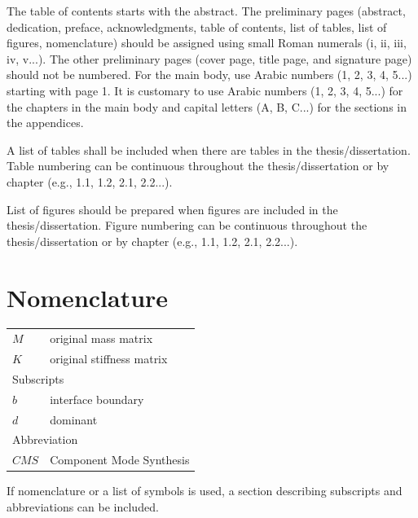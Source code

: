 \documentclass[11pt]{report}
\begin{document}
\renewcommand*\contentsname{Table of Contents}
\tableofcontents

\bigskip

The table of contents starts with the abstract. 
The preliminary pages (abstract, dedication, preface, acknowledgments, table of contents, list of tables, list of figures, nomenclature) should be assigned using small Roman numerals (i, ii, iii, iv, v...). The other preliminary pages (cover page, title page, and signature page) should not be numbered. For the main body, use Arabic numbers (1, 2, 3, 4, 5...) starting with page 1.
It is customary to use Arabic numbers (1, 2, 3, 4, 5...) for the chapters in the main body and capital letters (A, B, C...) for the sections in the appendices.

\listoftables
{}

\bigskip
A list of tables shall be included when there are tables in the thesis/dissertation. Table numbering can be continuous throughout the thesis/dissertation or by chapter (e.g., 1.1, 1.2, 2.1, 2.2...).

\listoffigures
{}

\bigskip
List of figures should be prepared when figures are included in the thesis/dissertation. Figure numbering can be continuous throughout the thesis/dissertation or by chapter (e.g., 1.1, 1.2, 2.1, 2.2...).

\chapter*{Nomenclature}
\begin{tabular}{p{}p{}}
$M$	& original mass matrix\\
$K$	& original stiffness matrix\\[30pt]
\multicolumn{2}{l}{Subscripts}\\
$b$ & interface boundary\\
$d$ & dominant\\[30pt]
\multicolumn{2}{l}{Abbreviation}\\
$CMS$ & Component Mode Synthesis\\
\end{tabular}

\bigskip
If nomenclature or a list of symbols is used, a section describing subscripts and abbreviations can be included.
\end{document}
